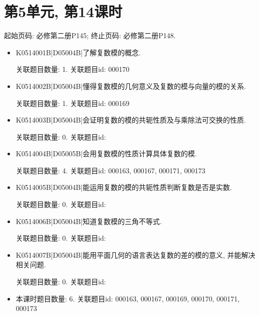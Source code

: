 \section*{第5单元, 第14课时}
起始页码: 必修第二册P145; 终止页码: 必修第二册P148.
\begin{itemize}
\item K0514001B|D05004B|了解复数模的概念.

关联题目数量: 1. 关联题目id: 000170

\item K0514002B|D05004B|懂得复数模的几何意义及复数的模与向量的模的关系.

关联题目数量: 1. 关联题目id: 000169

\item K0514003B|D05004B|会证明复数的模的共轭性质及与乘除法可交换的性质.

关联题目数量: 0. 关联题目id: 

\item K0514004B|D05005B|会用复数模的性质计算具体复数的模.

关联题目数量: 4. 关联题目id: 000163, 000167, 000171, 000173

\item K0514005B|D05004B|能运用复数的模的共轭性质判断复数是否是实数.

关联题目数量: 0. 关联题目id: 

\item K0514006B|D05004B|知道复数模的三角不等式.

关联题目数量: 0. 关联题目id: 

\item K0514007B|D05004B|能用平面几何的语言表达复数的差的模的意义, 并能解决相关问题.

关联题目数量: 0. 关联题目id: 

\item 本课时题目数量: 6. 关联题目id: 000163, 000167, 000169, 000170, 000171, 000173

\end{itemize}

